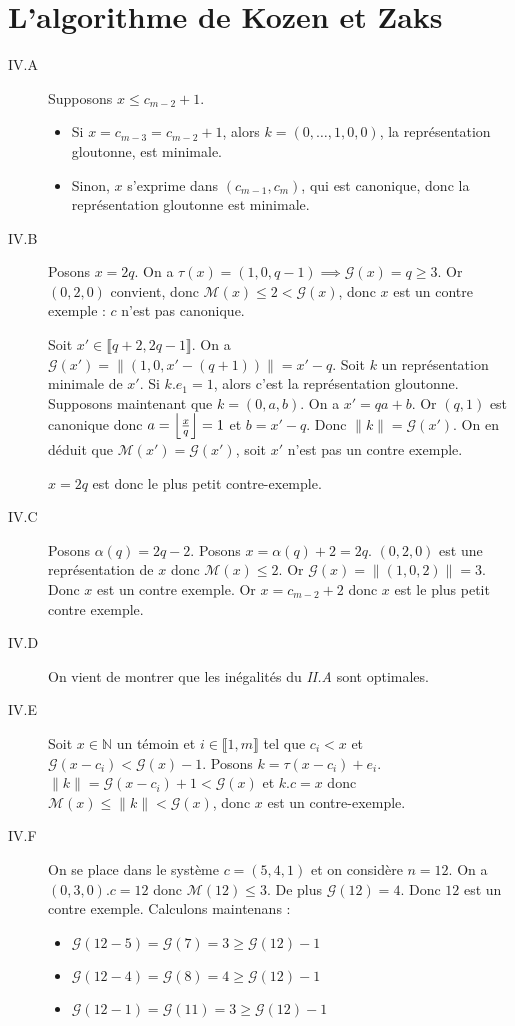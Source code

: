\documentclass{article}
\newcommand{\N}{\mathbb{N}}
\newcommand{\M}{\mathscr{M}}
\newcommand{\T}{\tau}
\newcommand{\G}{\mathscr{G}}
\newcommand{\norm}[1]{\|#1\|}
\newcommand{\scal}{.}
\newcommand{\seg}[2]{\llbracket #1, #2 \rrbracket}
\DeclarePairedDelimiter{\floor}{\lfloor}{\rfloor}
\begin{document}
\section{L'algorithme de Kozen et Zaks}
\begin{description}
    \item[IV.A] Supposons $x\leq c_{m-2} + 1$.\begin{itemize}
            \item Si $x = c_{m-3} = c_{m-2} + 1$, alors $k = (0,\ldots,1, 0, 0)$, la représentation gloutonne, est minimale.
            \item Sinon, $x$ s'exprime dans $(c_{m-1}, c_m)$, qui est canonique, donc la représentation gloutonne est minimale.
        \end{itemize}

    \item[IV.B] Posons $x = 2q$. On a $\T(x) = (1, 0, q-1) \implies \G(x) = q \geq 3$. Or $(0, 2, 0)$ convient, donc $\M(x) \leq 2 < \G(x)$, donc $x$ est un contre exemple : $c$ n'est pas canonique.

        Soit $x'\in\seg{q+2}{2q-1}$. On a $\G(x') = \norm{(1,0,x' - (q+1))} = x' - q$. Soit $k$ un représentation minimale de $x'$. Si $k\scal e_1 = 1$, alors c'est la représentation gloutonne. Supposons maintenant que $k=(0,a,b)$. On a $x' = qa + b$. Or $(q,1)$ est canonique donc $a = \floor*{\frac{x}{q}} = 1$ et $b = x' - q$. Donc $\norm{k} = \G(x')$. On en déduit que $\M(x') = \G(x')$, soit $x'$ n'est pas un contre exemple.

        $x = 2q$ est donc le plus petit contre-exemple.

    \item[IV.C] Posons $\alpha(q) = 2q - 2$. Posons $x = \alpha(q) + 2 = 2q$. $(0,2,0)$ est une représentation de $x$ donc $\M(x) \leq 2$. Or $\G(x) = \norm{(1,0,2)} = 3$. Donc $x$ est un contre exemple. Or $x = c_{m-2} + 2$ donc $x$ est le plus petit contre exemple.

    \item[IV.D] On vient de montrer que les inégalités du \emph{II.A} sont optimales.

    \item[IV.E] Soit $x\in\N$ un témoin et $i\in\seg{1}{m}$ tel que $c_i < x$ et $\G(x-c_i) < \G(x) - 1$. Posons $k = \T(x-c_i) + e_i$. $\norm{k} = \G(x-c_i) + 1 < \G(x)$ et $k\scal c = x$ donc $\M(x) \leq \norm{k} < \G(x)$, donc $x$ est un contre-exemple.

    \item[IV.F] On se place dans le système $c = (5,4,1)$ et on considère $n=12$. On a $(0,3,0)\scal c = 12$ donc $\M(12) \leq 3$. De plus $\G(12) = 4$. Donc $12$ est un contre exemple. Calculons maintenans :\begin{itemize}
            \item $\G(12-5) = \G(7) = 3  \geq \G(12) - 1$
            \item $\G(12-4) = \G(8) = 4  \geq \G(12) - 1$
            \item $\G(12-1) = \G(11) = 3 \geq \G(12) - 1$
        \end{itemize}


\end{description}
\end{document}
